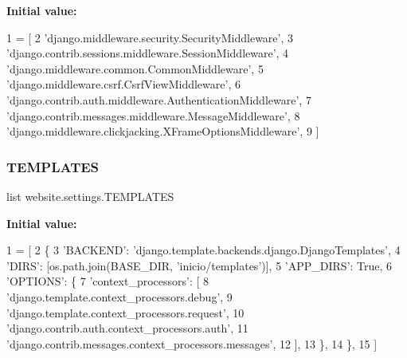 {\bfseries Initial value\+:}
\begin{DoxyCode}
1 =  [
2     \textcolor{stringliteral}{'django.middleware.security.SecurityMiddleware'},
3     \textcolor{stringliteral}{'django.contrib.sessions.middleware.SessionMiddleware'},
4     \textcolor{stringliteral}{'django.middleware.common.CommonMiddleware'},
5     \textcolor{stringliteral}{'django.middleware.csrf.CsrfViewMiddleware'},
6     \textcolor{stringliteral}{'django.contrib.auth.middleware.AuthenticationMiddleware'},
7     \textcolor{stringliteral}{'django.contrib.messages.middleware.MessageMiddleware'},
8     \textcolor{stringliteral}{'django.middleware.clickjacking.XFrameOptionsMiddleware'},
9 ]
\end{DoxyCode}
\mbox{\label{namespacewebsite_1_1settings_a0b4caae5c8732d840e4777ebd5a52932}} 
\subsubsection{\texorpdfstring{T\+E\+M\+P\+L\+A\+T\+ES}{TEMPLATES}}
{\footnotesize\ttfamily list website.\+settings.\+T\+E\+M\+P\+L\+A\+T\+ES}

{\bfseries Initial value\+:}
\begin{DoxyCode}
1 =  [
2     \{
3         \textcolor{stringliteral}{'BACKEND'}: \textcolor{stringliteral}{'django.template.backends.django.DjangoTemplates'},
4         \textcolor{stringliteral}{'DIRS'}: [os.path.join(BASE\_DIR, \textcolor{stringliteral}{'inicio/templates'})],
5         \textcolor{stringliteral}{'APP\_DIRS'}: \textcolor{keyword}{True},
6         \textcolor{stringliteral}{'OPTIONS'}: \{
7             \textcolor{stringliteral}{'context\_processors'}: [
8                 \textcolor{stringliteral}{'django.template.context\_processors.debug'},
9                 \textcolor{stringliteral}{'django.template.context\_processors.request'},
10                 \textcolor{stringliteral}{'django.contrib.auth.context\_processors.auth'},
11                 \textcolor{stringliteral}{'django.contrib.messages.context\_processors.messages'},
12             ],
13         \},
14     \},
15 ]
\end{DoxyCode}
